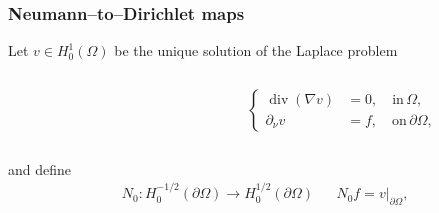 \documentclass[10pt]{beamer}
\theoremstyle{plain}
\theoremstyle{plain}
\DeclareMathOperator{\divergence}{div}
\begin{document}
\begin{frame}
 \frametitle{Neumann--to--Dirichlet maps}
  Let $v\in H^1_0(\Omega)$ be the unique solution of the {\color{blue}Laplace problem}
 \begin{columns}[T]
  \begin{column}{0.5\textwidth}
    \begin{center}
    \end{center}
  \end{column}
  \hspace{-2cm}
  \begin{column}{0.5\textwidth}
  \vspace{0.6cm}
  \begin{center}
 \begin{equation}
 \label{eq:NtoD-inclusion}
  \left\{
  \begin{aligned}
  \divergence(\nabla v) &= 0, \quad\text{in}\,\Omega, \\
            \partial_\nu v &= f, \quad\text{on}\,\partial \Omega,
  \end{aligned}
  \right.
 \end{equation}
 \end{center}
 \end{column}
 \end{columns}
 \vspace{0.6cm}
 and define
   \begin{align}
   &{N_0}: H^{-1/2}_0(\partial \Omega) \to H^{1/2}_0(\partial\Omega) && {N_0} f = v|_{\partial\Omega},
   \end{align}
\end{frame}
\end{document}
